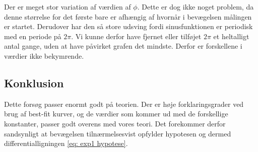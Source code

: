 Der er meget stor variation af værdien af $\phi$.
Dette er dog ikke noget problem, da denne størrelse for det første bare er afhængig af hvornår i bevægelsen målingen er startet.
Derudover har den så store udsving fordi sinusfunktionen er periodisk med en periode på $2\pi$.
Vi kunne derfor have fjernet eller tilføjet $2\pi$ et heltalligt antal gange, uden at have påvirket grafen det mindste. 
Derfor er forskellene i værdier ikke bekymrende. 

\subsection{Konklusion}
Dette forsøg passer enormt godt på teorien. 
Der er høje forklaringsgrader ved brug af best-fit kurver, og de værdier som kommer ud med de forskellige konstanter, passer godt overens med vores teori.
Det forekommer derfor sandsynligt at bevægelsen tilnærmelsesvist opfylder hypotesen og dermed differentialligningen \ref{eq: exp1 hypotese}.

